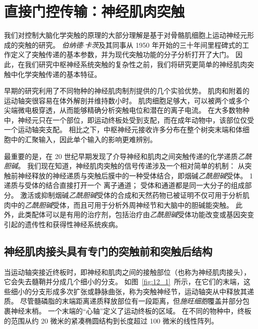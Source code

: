 \chapter{直接门控传输：神经肌肉突触} \label{chap:chap12}


我们对控制大脑化学突触的原理的大部分理解是基于对骨骼肌细胞上运动神经元形成的突触的研究。
\textit{伯纳德$\cdot$卡茨}及其同事从 1950 年开始的三十年间里程碑式的工作定义了突触传递的基本参数，并为现代突触功能的分子分析打开了大门。
因此，在我们研究中枢神经系统突触的复杂性之前，我们将研究更简单的神经肌肉突触中化学突触传递的基本特征。


早期的研究利用了不同物种的神经肌肉制剂提供的几个实验优势。
肌肉和附着的运动轴突很容易在体外解剖并维持数小时。
肌肉细胞足够大，可以被两个或多个尖端微电极穿透，从而能够精确分析突触电位和潜在的离子电流。
在大多数物种中，神经元只在一个部位，即运动终板处受到支配，而在成年动物中，该部位仅受一个运动轴突支配。
相比之下，中枢神经元接收许多分布在整个树突末端和体细胞中的汇聚输入，因此单个输入的影响更难辨别。


最重要的是，在 20 世纪早期发现了介导神经和肌肉之间突触传递的化学递质\textit{乙酰胆碱}。
我们现在知道，神经肌肉突触的信号传递涉及一个相对简单的机制：
从突触前神经释放的神经递质与突触后膜中的一种受体结合，即烟碱\textit{乙酰胆碱}受体。
1 递质与受体的结合直接打开一个 离子通道；
受体和通道都是同一大分子的组成部分。
激活或抑制烟碱\textit{乙酰胆碱}受体的合成和天然药物已被证明不仅可用于分析肌肉中的\textit{乙酰胆碱}受体，而且可用于分析外周神经节和大脑中的胆碱能突触。
此外，此类配体可以是有用的治疗剂，包括治疗由\textit{乙酰胆碱}受体功能改变或基因突变引起的遗传性和获得性神经系统疾病。



\section{神经肌肉接头具有专门的突触前和突触后结构}

当运动轴突接近终板时，即神经和肌肉之间的接触部位（也称为神经肌肉接头），它会失去髓鞘并分成几个细小的分支。
如图~\ref{fig:12_1}~所示，在它们的末端，这些细小的分支形成多次扩张或静脉曲张，称为突触神经节，运动轴突从中释放其递质。
尽管髓磷脂的末端距离递质释放部位有一段距离，但\textit{施旺细胞}覆盖并部分包裹神经末梢。
一个末端的“心轴”定义了运动终板的区域。
在不同的物种中，终板的范围从约 20 微米的紧凑椭圆结构到长度超过 100 微米的线性阵列。


